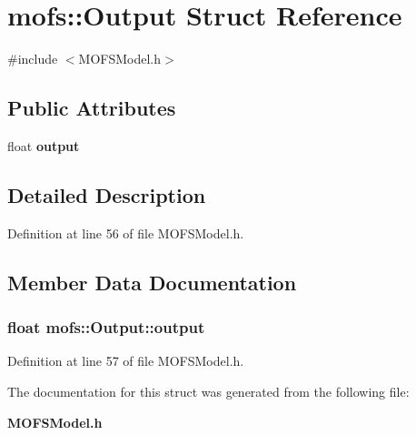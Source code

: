 \section{mofs\-:\-:Output Struct Reference}
\label{structmofs_1_1Output}


{\ttfamily \#include $<$M\-O\-F\-S\-Model.\-h$>$}

\subsection*{Public Attributes}
\begin{DoxyCompactItemize}
\item 
float {\bf output}
\end{DoxyCompactItemize}


\subsection{Detailed Description}


Definition at line 56 of file M\-O\-F\-S\-Model.\-h.



\subsection{Member Data Documentation}
\subsubsection[{output}]{\setlength{\rightskip}{0pt plus 5cm}float mofs\-::\-Output\-::output}\label{structmofs_1_1Output_afeeb8bae42f878459b99abd149b47aaf}


Definition at line 57 of file M\-O\-F\-S\-Model.\-h.



The documentation for this struct was generated from the following file\-:\begin{DoxyCompactItemize}
\item 
{\bf M\-O\-F\-S\-Model.\-h}\end{DoxyCompactItemize}
